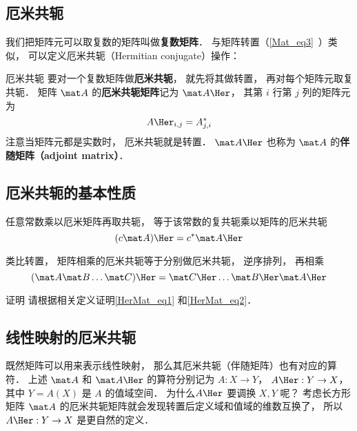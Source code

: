 

\subsection{厄米共轭}
我们把矩阵元可以取复数的矩阵叫做\textbf{复数矩阵}． %
与矩阵转置（\autoref{Mat_eq3}~）类似， 可以定义厄米共轭（Hermitian conjugate）操作：

\begin{definition}{厄米共轭}
要对一个复数矩阵做\textbf{厄米共轭}， 就先将其做转置， 再对每个矩阵元取复共轭． 矩阵 $\mat A$ 的\textbf{厄米共轭矩阵}记为 $\mat A\Her$， 其第 $i$ 行第 $j$ 列的矩阵元为
\begin{equation}
A\Her_{i,j} = A_{j,i}^*
\end{equation}
注意当矩阵元都是实数时， 厄米共轭就是转置． $\mat A\Her$ 也称为 $\mat A$ 的\textbf{伴随矩阵（adjoint matrix）}．
\end{definition}

\subsection{厄米共轭的基本性质}
任意常数乘以厄米矩阵再取共轭， 等于该常数的复共轭乘以矩阵的厄米共轭
\begin{equation}\label{HerMat_eq1}
(c \mat A)\Her = c^* \mat A\Her
\end{equation}

类比转置，%
矩阵相乘的厄米共轭等于分别做厄米共轭， 逆序排列， 再相乘
\begin{equation}\label{HerMat_eq2}
(\mat A \mat B \dots \mat C)\Her  = \mat C\Her \dots \mat B\Her \mat A\Her
\end{equation}

\begin{exercise}{证明}
请根据相关定义证明\autoref{HerMat_eq1} 和\autoref{HerMat_eq2}．
\end{exercise}

\subsection{线性映射的厄米共轭}
既然矩阵可以用来表示线性映射， 那么其厄米共轭（伴随矩阵）也有对应的算符． 上述 $\mat A$ 和 $\mat A\Her$ 的算符分别记为 $A:X\to Y$， $A\Her: Y\to X$， 其中 $Y = A(X)$ 是 $A$ 的值域空间． 为什么$A\Her$ 要调换 $X, Y$ 呢？ 考虑长方形矩阵 $\mat A$ 的厄米共轭矩阵就会发现转置后定义域和值域的维数互换了， 所以 $A\Her:Y\to X$ 是更自然的定义．

